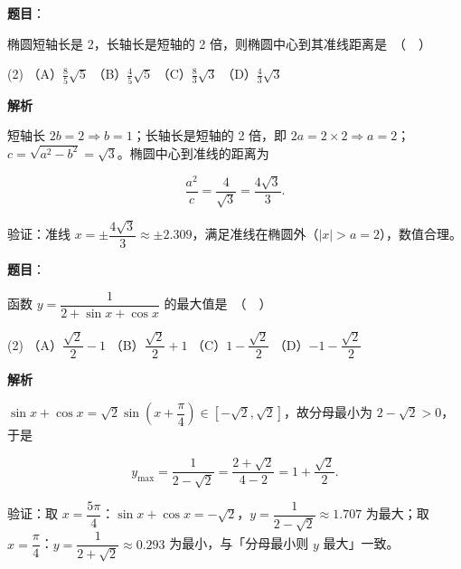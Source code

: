 \begin{answer}

\textbf{题目}：

椭圆短轴长是 2，长轴长是短轴的 2 倍，则椭圆中心到其准线距离是　（　）

\begin{gkopts}(2)
\task （A）$\frac{8}{5}\sqrt{5}$
\task （B）$\frac{4}{5}\sqrt{5}$
\task （C）$\frac{8}{3}\sqrt{3}$
\task （D）$\frac{4}{3}\sqrt{3}$
\end{gkopts}

\textbf{解析}

短轴长 $2b=2\Rightarrow b=1$；长轴长是短轴的 2 倍，即 $2a=2\times2\Rightarrow a=2$；$c=\sqrt{a^2-b^2}=\sqrt3$。椭圆中心到准线的距离为

\nopagebreak[4]
\[\frac{a^2}{c}=\frac{4}{\sqrt3}=\frac{4\sqrt3}{3}.\]

验证：准线 $x=\pm\dfrac{4\sqrt3}{3}\approx\pm2.309$，满足准线在椭圆外（$|x|>a=2$），数值合理。


\par\medskip

\end{answer}
\begin{answer}

\textbf{题目}：

函数 $y = \dfrac{1}{2 + \sin x + \cos x}$ 的最大值是　（　）

\begin{gkopts}(2)
\task （A）$\dfrac{\sqrt{2}}{2} - 1$
\task （B）$\dfrac{\sqrt{2}}{2} + 1$
\task （C）$1 - \dfrac{\sqrt{2}}{2}$
\task （D）$-1 - \dfrac{\sqrt{2}}{2}$
\end{gkopts}

\textbf{解析}

$\sin x+\cos x=\sqrt2\sin\!\left(x+\dfrac\pi4\right)\in[-\sqrt2,\sqrt2]$，故分母最小为 $2-\sqrt2>0$，于是

\nopagebreak[4]
\[y_{\max}=\frac{1}{2-\sqrt2}=\frac{2+\sqrt2}{4-2}=1+\frac{\sqrt2}{2}.\]

验证：取 $x=\dfrac{5\pi}{4}$：$\sin x+\cos x=-\sqrt2$，$y=\dfrac{1}{2-\sqrt2}\approx1.707$ 为最大；取 $x=\dfrac{\pi}{4}$：$y=\dfrac{1}{2+\sqrt2}\approx0.293$ 为最小，与「分母最小则 $y$ 最大」一致。


\par\medskip

\end{answer}
